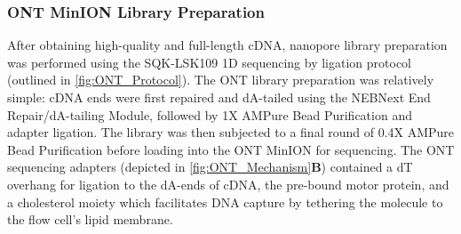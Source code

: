 \subsubsection{ONT MinION Library Preparation}
\label{sec: ONTlib_preparation}
After obtaining high-quality and full-length cDNA, nanopore library preparation was performed using the SQK-LSK109 1D sequencing by ligation protocol (outlined in \cref{fig:ONT_Protocol}). The ONT library preparation was relatively simple: cDNA ends were first repaired and dA-tailed using the NEBNext End Repair/dA-tailing Module, followed by 1X AMPure Bead Purification and adapter ligation. The library was then subjected to a final round of 0.4X AMPure Bead Purification before loading into the ONT MinION for sequencing. The ONT sequencing adapters (depicted in \cref{fig:ONT_Mechanism}\textbf{B}) contained a dT overhang for ligation to the dA-ends of cDNA, the pre-bound motor protein, and a cholesterol moiety which facilitates DNA capture by tethering the molecule to the flow cell's lipid membrane.

